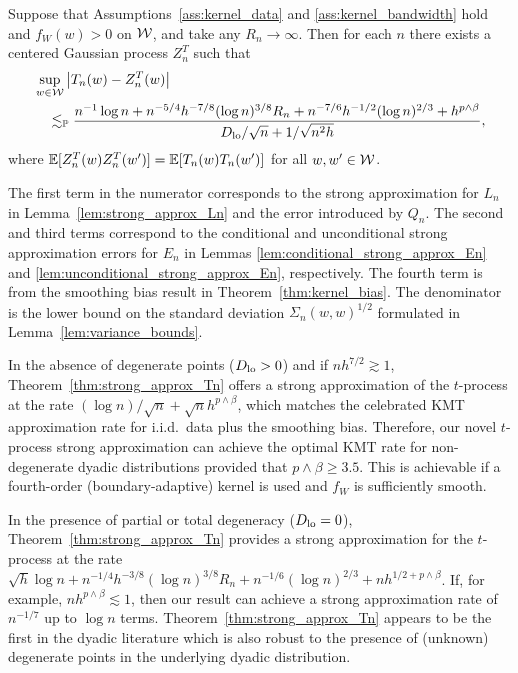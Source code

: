 \begin{theorem}
  \label{thm:strong_approx_Tn}

  Suppose that Assumptions~\ref{ass:kernel_data} and \ref{ass:kernel_bandwidth}
  hold and $f_W(w) > 0$ on $\mathcal{W}$, and take any $R_n \to \infty$. Then for each
  $n$ there exists a centered Gaussian process $Z_n^{T}$ such that
  \begin{align*}
    &\sup_{w \in \mathcal{W}} \left| T_n(w) - Z_n^{T}(w) \right| \\
    &\quad\lesssim_{\mathbb{P}}
    \frac{
      n^{-1} \log n
      + n^{-5/4} h^{-7/8} (\log n)^{3/8} R_n
      + n^{-7/6} h^{-1/2} (\log n)^{2/3}
    + h^{p\wedge\beta}}
    {D_{\textup{lo}}/\sqrt{n} + 1/\sqrt{n^2h}},
  \end{align*}
  where $\mathbb{E}[Z_n^T(w)Z_n^T(w')] = \mathbb{E}[T_n(w)T_n(w')]$ for all $w,w' \in \mathcal{W}$.
\end{theorem}

The first term in the numerator corresponds to the strong approximation for
$L_n$ in Lemma~\ref{lem:strong_approx_Ln} and the error introduced by $Q_n$.
The second and third terms correspond to the conditional and unconditional
strong approximation errors for $E_n$ in Lemmas
\ref{lem:conditional_strong_approx_En} and
\ref{lem:unconditional_strong_approx_En}, respectively. The fourth term is from
the smoothing bias result in Theorem~\ref{thm:kernel_bias}. The denominator is
the lower bound on the standard deviation $\Sigma_n(w,w)^{1/2}$ formulated in
Lemma~\ref{lem:variance_bounds}.

In the absence of degenerate points ($D_{\textup{lo}} > 0$) and if $n h^{7/2}\gtrsim 1$,
Theorem~\ref{thm:strong_approx_Tn} offers a strong approximation of the
$t$-process at the rate $(\log n)/\sqrt{n}+\sqrt{n}h^{p\wedge\beta}$, which
matches the celebrated KMT approximation rate for i.i.d.\ data plus the
smoothing bias. Therefore, our novel $t$-process strong approximation can
achieve the optimal KMT rate for non-degenerate dyadic distributions provided
that $p\wedge\beta \geq 3.5$. This is achievable if a fourth-order
(boundary-adaptive) kernel is used and $f_W$ is sufficiently smooth.

In the presence of partial or total degeneracy ($D_{\textup{lo}} =0$),
Theorem~\ref{thm:strong_approx_Tn} provides a strong approximation for the
$t$-process at the rate
$\sqrt{h}\log n + n^{-1/4}h^{-3/8}(\log n)^{3/8} R_n + n^{-1/6}(\log n)^{2/3}
+ n h^{1/2+p\wedge\beta}$. If, for example, $n h^{p\wedge\beta}\lesssim 1$,
then our result can achieve a strong approximation rate of $n^{-1/7}$ up to
$\log n $ terms. Theorem~\ref{thm:strong_approx_Tn} appears to be the first in
the dyadic literature which is also robust to the presence of (unknown)
degenerate points in the underlying dyadic distribution.

